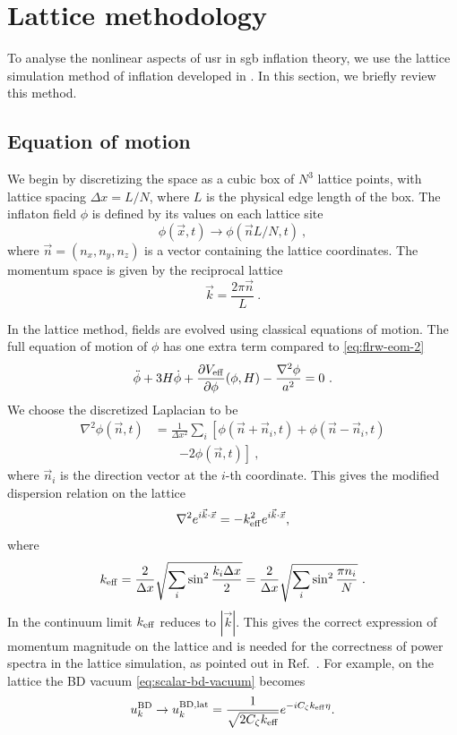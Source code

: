 \documentclass[reprint, 10pt, amsmath, amssymb, floatfix, aps, prd, superscriptaddress, nofootinbib, nobibnotes,twocolumn]{revtex4-1}
\begin{document}
\section{Lattice methodology}
\label{sec:lattice-method}
To analyse the nonlinear aspects of \ac{usr} in \ac{sgb} inflation theory, we use the lattice simulation method of inflation developed in \cite{Caravano:2021pgc,Caravano:2022epk}. In this section, we briefly review this method.

\subsection{Equation of motion}
We begin by discretizing the space as a cubic box of $N^3$ lattice points, with lattice spacing $\Delta x = L / N$, where $L$ is the physical edge length of the box. The inflaton field $\phi$ is defined by its values on each lattice site
\begin{equation}
	\phi(\vec x, t) \to \phi(\vec n L / N, t) \ ,
\end{equation}
where $\vec n = (n_x, n_y, n_z)$ is a vector containing the lattice coordinates. The momentum space is given by the reciprocal lattice
\begin{equation}
	\vec k = \frac{2\pi\vec n}{L} \ .
\end{equation}

In the lattice method, fields are evolved using classical equations of motion. The full equation of motion of $\phi$ has one extra term compared to \eqref{eq:flrw-eom-2}
\begin{equation}
	\ddot\phi + 3H\dot\phi + \frac{\partial V_{\rm eff}}{\partial\phi}(\phi, H) - \frac{\nabla^2\phi}{a^2} = 0 \ .
\end{equation}
We choose the discretized Laplacian to be
\begin{align}
	\nabla^2\phi(\vec n, t) & = \frac{1}{\Delta x^2}\sum_i \left[\phi(\vec n + \vec n_i, t) + \phi(\vec n - \vec n_i, t)\right.\nonumber\\
    & \qquad \left.- 2\phi(\vec n, t)\right] \ ,
\end{align}
where $\vec n_i$ is the direction vector at the $i$-th coordinate. This gives the modified dispersion relation on the lattice
\begin{equation}
	\nabla^2 e^{i\vec k\cdot\vec x} = -k_{\rm eff}^2 e^{i\vec k\cdot\vec x},
\end{equation}
where
\begin{equation}\label{eq:k-eff}
	k_{\rm eff} = \frac{2}{\Delta x}\sqrt{\sum_i\sin^2\frac{k_i\Delta x}{2}} = \frac{2}{\Delta x}\sqrt{\sum_i\sin^2 \frac{\pi n_i}{N}} \ .
\end{equation}
In the continuum limit $k_{\rm eff}$ reduces to $|\vec k|$. This gives the correct expression of momentum magnitude on the lattice and is needed for the correctness of power spectra in the lattice simulation, as pointed out in Ref.~\cite{Caravano:2021pgc}. For example, on the lattice the BD vacuum \eqref{eq:scalar-bd-vacuum} becomes
\begin{equation}\label{eq:scalar-bd-vacuum-lat}
	u_k^{\rm BD} \to u_k^{\rm BD, lat} = \frac{1}{\sqrt{2C_\zeta k_{\rm eff}}} e^{-iC_\zeta k_{\rm eff}\eta}.
\end{equation}
\end{document}
